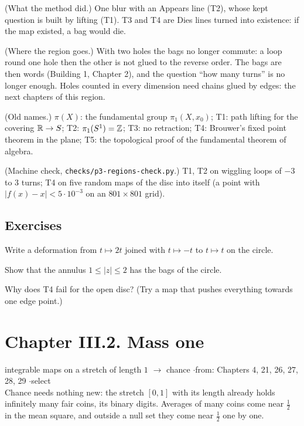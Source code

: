 \begin{lines}
\item[\lab{R1}] (What the method did.) One blur with an Appears line (T2), whose kept question is built by lifting (T1). T3 and T4 are Dies lines turned into existence: if the map existed, a bag would die.
\item[\lab{R2}] (Where the region goes.) With two holes the bags no longer commute: a loop round one hole then the other is not glued to the reverse order. The bags are then words (Building 1, Chapter 2), and the question ``how many turns'' is no longer enough. Holes counted in every dimension need chains glued by edges: the next chapters of this region.
\item[\lab{R3}] (Old names.) $\pi(X)$: the fundamental group $\pi_1(X, x_0)$; T1: path lifting for the covering $\mathbb{R} \to S$; T2: $\pi_1(S^1) = \mathbb{Z}$; T3: no retraction; T4: Brouwer's fixed point theorem in the plane; T5: the topological proof of the fundamental theorem of algebra.
\item[\lab{R4}] (Machine check, \texttt{checks/p3-regions-check.py}.) T1, T2 on wiggling loops of $-3$ to $3$ turns; T4 on five random maps of the disc into itself (a point with $|f(x) - x| < 5 \cdot 10^{-3}$ on an $801 \times 801$ grid).
\end{lines}

\subsection*{Exercises}

\begin{lines}
\item[\lab{E1}] Write a deformation from $t \mapsto 2t$ joined with $t \mapsto -t$ to $t \mapsto t$ on the circle.
\item[\lab{E2}] Show that the annulus $1 \le |z| \le 2$ has the bags of the circle.
\item[\lab{E3}] Why does T4 fail for the open disc? (Try a map that pushes everything towards one edge point.)
\end{lines}

\newpage

\section*{Chapter III.2. Mass one}
\begin{center}
{\normalsize integrable maps on a stretch of length $1$ $\to$ chance \quad$\cdot$\quad from: Chapters 4, 21, 26, 27, 28, 29 \quad$\cdot$\quad select}\\[4pt]
{\small Chance needs nothing new: the stretch $[0, 1]$ with its length already holds infinitely many fair coins, its binary digits. Averages of many coins come near $\tfrac12$ in the mean square, and outside a null set they come near $\tfrac12$ one by one.}
\end{center}

